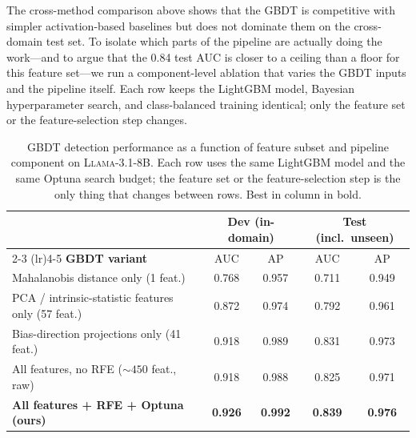 \documentclass[11pt]{article}
\begin{document}
The cross-method comparison above shows that the GBDT is competitive with simpler activation-based baselines but does not dominate them on the cross-domain test set. To isolate which parts of the pipeline are actually doing the work---and to argue that the 0.84 test AUC is closer to a ceiling than a floor for this feature set---we run a component-level ablation that varies the GBDT inputs and the pipeline itself. Each row keeps the LightGBM model, Bayesian hyperparameter search, and class-balanced training identical; only the feature set or the feature-selection step changes.

\begin{table}[h!]
\centering
\small
\setlength{\tabcolsep}{6pt}
\caption{GBDT detection performance as a function of feature subset and pipeline component on \textsc{Llama-3.1-8B}. Each row uses the same LightGBM model and the same Optuna search budget; the feature set or the feature-selection step is the only thing that changes between rows. Best in column in bold.}
\label{tab:detection_ablation}
\begin{tabular}{l cc cc}
\toprule
& \multicolumn{2}{c}{\textbf{Dev (in-domain)}} & \multicolumn{2}{c}{\textbf{Test (incl.\ unseen)}} \\
\cmidrule(lr){2-3} \cmidrule(lr){4-5}
\textbf{GBDT variant} & AUC & AP & AUC & AP \\
\midrule
Mahalanobis distance only (1 feat.) & 0.768 & 0.957 & 0.711 & 0.949 \\
PCA / intrinsic-statistic features only (57 feat.) & 0.872 & 0.974 & 0.792 & 0.961 \\
Bias-direction projections only (41 feat.) & 0.918 & 0.989 & 0.831 & 0.973 \\
All features, no RFE ($\sim 450$ feat., raw) & 0.918 & 0.988 & 0.825 & 0.971 \\
\textbf{All features + RFE + Optuna (ours)} & \textbf{0.926} & \textbf{0.992} & \textbf{0.839} & \textbf{0.976} \\
\bottomrule
\end{tabular}
\end{table}
\end{document}
